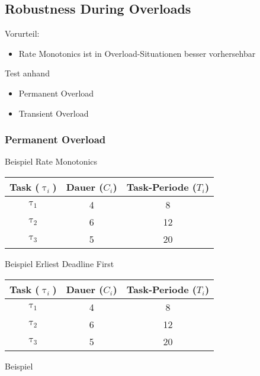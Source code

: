 \subsection{Robustness During Overloads}

\begin{frame}{\subsecname}
	Vorurteil:
	\begin{itemize}
		\item Rate Monotonics ist in Overload-Situationen besser vorhersehbar
	\end{itemize}$ $\\\pause
	Test anhand
	\begin{itemize}
		\item Permanent Overload
		\item Transient Overload
	\end{itemize}
\end{frame}

\subsubsection{Permanent Overload}
\begin{frame}{Beispiel Rate Monotonics}
	\begin{center}
		\begin{tabular}{c||c|c}
			Task ($\uptau_i$) & Dauer ($C_i$) & Task-Periode ($T_i$)\\\hline\hline
			$\uptau_1$ & 4 & 8\\
			$\uptau_2$ & 6 & 12\\
			$\uptau_3$ & 5 & 20
		\end{tabular}
	\end{center}
	
\end{frame}

\begin{frame}{Beispiel Erliest Deadline First}
	\begin{center}
		\begin{tabular}{c||c|c}
			Task ($\uptau_i$) & Dauer ($C_i$) & Task-Periode ($T_i$)\\\hline\hline
			$\uptau_1$ & 4 & 8\\
			$\uptau_2$ & 6 & 12\\
			$\uptau_3$ & 5 & 20
		\end{tabular}
	\end{center}
	
\end{frame}

\begin{frame}{Beispiel}
	
	
\end{frame}

